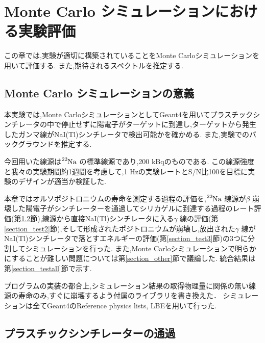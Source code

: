 \chapter{Monte Carlo シミュレーションにおける実験評価}\label{simulation}

この章では,実験が適切に構築されていることをMonte Carloシミュレーションを用いて評価する.
また,期待されるスペクトルを推定する.

\section{Monte Carlo シミュレーションの意義}

本実験では,Monte CarloシミュレーションとしてGeant4\cite{geant4}を用いてプラスチックシンチレータの中で停止せずに陽電子がターゲットに到達し,ターゲットから発生したガンマ線がNaI(Tl)シンチレータで検出可能かを確かめる.
また,実験でのバックグラウンドを推定する.

今回用いた線源は$\ce{^{22}Na}$ の標準線源であり,200 kBqのものである.
この線源強度と我々の実験期間約1週間を考慮して,1 Hzの実験レートとS/N比100を目標に実験のデザインが適当か検証した.


本章ではオルソポジトロニウムの寿命を測定する過程の評価を,$\ce{^{22}Na}$ 線源が$\beta$ 崩壊した陽電子がシンチレーターを通過してシリカゲルに到達する過程のレート評価(第\ref{section_test1}節),線源から直接NaI(Tl)シンチレータに入る$\gamma$ 線の評価(第\ref{section_test2}節),そして形成されたポジトロニウムが崩壊し,放出された$\gamma$ 線がNaI(Tl)シンチレータで落とすエネルギーの評価(第\ref{section_test3}節)の3つに分割してシミュレーションを行った.
また,Monte Carloシミュレーションで明らかにすることが難しい問題については第\ref{section_other}節で議論した.
統合結果は第\ref{section_testall}節で示す.

プログラムの実装の都合上,シミュレーション結果の取得物理量に関係の無い線源の寿命のみ,すぐに崩壊するよう付属のライブラリを書き換えた．
シミュレーションは全てGeant4のReference physics lists, LBEを用いて行った.

\section{プラスチックシンチレーターの通過}
\label{section_test1}

